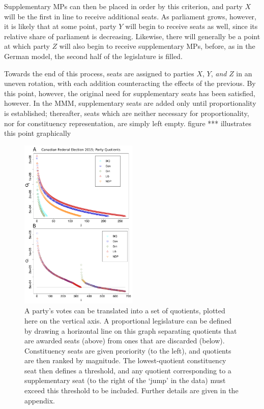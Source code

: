 \documentclass[DIV=calc, paper=a4, fontsize=11pt, twocolumn]{scrartcl}	 %
\begin{document}
Supplementary MPs can then be placed in order by this criterion, and party $X$ will be the first in line to receive additional seats. As parliament grows, however, it is likely that at some point, party $Y$ will begin to receive seats as well, since its relative share of parliament is decreasing. Likewise, there will generally be a point at which party $Z$ will also begin to receive supplementary MPs, before, as in the German model, the second half of the legislature is filled. 

Towards the end of this process, seats are assigned to parties $X$, $Y$, \emph{and} $Z$ in an uneven rotation, with each addition counteracting the effects of the previous. By this point, however, the original need for supplementary seats has been satisfied, however. 
In the MMM, supplementary seats are added only until proportionality is established; thereafter, seats which are neither necessary for proportionality, nor for constituency representation, are simply left empty. {\color{red} figure ***  illustrates this point graphically}

\begin{figure}[h!]
  \includegraphics[width=0.50\textwidth,clip]{Figs/2015_quotients_figure_composite}
  \captionsetup{format=default}
  \caption{ A party's votes can be translated into a set of quotients, plotted here on the vertical axis. A proportional legislature can be defined by drawing a horizontal line on this graph separating quotients that are awarded seats (above) from ones that are discarded (below). Constituency seats are given proriority (to the left), and quotients are then ranked by magnitude. The lowest-quotient constituency seat then defines a threshold, and any quotient corresponding to a supplementary seat (to the right of the `jump' in the data) must exceed this threshold to be included. Further details are given in the appendix.}
\label{fig:ordered quotients}
\end{figure}
\end{document}

